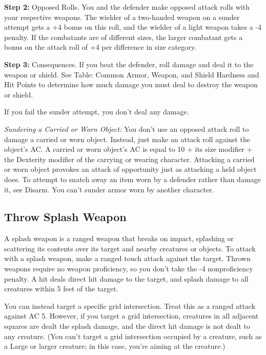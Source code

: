 \textbf{Step 2:} Opposed Rolls. You and the defender make opposed attack rolls 
with your respective weapons. The wielder of a two-handed weapon on a sunder attempt 
gets a +4 bonus on this roll, and the wielder of a light weapon takes a -4 penalty. 
If the combatants are of different sizes, the larger combatant gets a bonus on 
the attack roll of +4 per difference in size category.

\textbf{Step 3:} Consequences. If you beat the defender, roll damage and deal it 
to the weapon or shield. See Table: Common Armor, Weapon, and Shield Hardness and 
Hit Points to determine how much damage you must deal to destroy the weapon or 
shield.

If you fail the sunder attempt, you don't deal any damage.

\textit{Sundering a Carried or Worn Object:} You don't use an opposed attack roll 
to damage a carried or worn object. Instead, just make an attack roll against the 
object's AC. A carried or worn object's AC is equal to 10 + its size modifier + 
the Dexterity modifier of the carrying or wearing character. Attacking a carried 
or worn object provokes an attack of opportunity just as attacking a held object 
does. To attempt to snatch away an item worn by a defender rather than damage it, 
see Disarm. You can't sunder armor worn by another character.

\subsection{Throw Splash Weapon}

A splash weapon is a ranged weapon that breaks on impact, splashing or scattering 
its contents over its target and nearby creatures or objects. To attack with a 
splash weapon, make a ranged touch attack against the target. Thrown weapons require 
no weapon proficiency, so you don't take the -4 nonproficiency penalty. A hit deals 
direct hit damage to the target, and splash damage to all creatures within 5 feet 
of the target.

You can instead target a specific grid intersection. Treat this as a ranged attack 
against AC 5. However, if you target a grid intersection, creatures in all adjacent 
squares are dealt the splash damage, and the direct hit damage is not dealt to 
any creature. (You can't target a grid intersection occupied by a creature, such 
as a Large or larger creature; in this case, you're aiming at the creature.)

